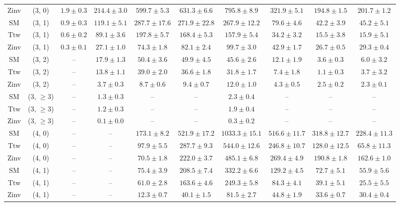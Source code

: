\begin{table}[h!]
{\begin{tabular}{cccccccccc}
	Zinv & (3, 0) & $1.9\pm 0.3$ & $214.4\pm 3.0$ & $599.7\pm 5.3$ & $631.3\pm 6.6$ & $795.8\pm 8.9$ & $321.9\pm 5.1$ & $194.8\pm 1.5$ & $201.7\pm 1.2$ \\[0.5ex] 
	SM & (3, 1) & $0.9\pm 0.3$ & $119.1\pm 5.1$ & $287.7\pm 17.6$ & $271.9\pm 22.8$ & $267.9\pm 12.2$ & $79.6\pm 4.6$ & $42.2\pm 3.9$ & $45.2\pm 5.1$ \\[0.5ex] 
	Ttw & (3, 1) & $0.6\pm 0.2$ & $89.1\pm 3.6$ & $197.8\pm 5.7$ & $168.4\pm 5.3$ & $157.9\pm 5.4$ & $34.2\pm 3.2$ & $15.5\pm 3.8$ & $15.9\pm 5.1$ \\[0.5ex] 
	Zinv & (3, 1) & $0.3\pm 0.1$ & $27.1\pm 1.0$ & $74.3\pm 1.8$ & $82.1\pm 2.4$ & $99.7\pm 3.0$ & $42.9\pm 1.7$ & $26.7\pm 0.5$ & $29.3\pm 0.4$ \\[0.5ex] 
	SM & (3, 2) & -- & $17.9\pm 1.3$ & $50.4\pm 3.6$ & $49.9\pm 4.5$ & $45.6\pm 2.6$ & $12.1\pm 1.9$ & $3.6\pm 0.3$ & $6.0\pm 3.2$ \\[0.5ex] 
	Ttw & (3, 2) & -- & $13.8\pm 1.1$ & $39.0\pm 2.0$ & $36.6\pm 1.8$ & $31.8\pm 1.7$ & $7.4\pm 1.8$ & $1.1\pm 0.3$ & $3.7\pm 3.2$ \\[0.5ex] 
	Zinv & (3, 2) & -- & $3.7\pm 0.3$ & $8.7\pm 0.6$ & $9.4\pm 0.7$ & $12.0\pm 1.0$ & $4.3\pm 0.5$ & $2.5\pm 0.2$ & $2.3\pm 0.1$ \\[0.5ex] 
	SM & (3, $\ge3$) & -- & $1.3\pm 0.3$ & -- & -- & $2.3\pm 0.4$ & -- & -- & -- \\[0.5ex] 
	Ttw & (3, $\ge3$) & -- & $1.2\pm 0.3$ & -- & -- & $1.9\pm 0.4$ & -- & -- & -- \\[0.5ex] 
	Zinv & (3, $\ge3$) & -- & $0.1\pm 0.0$ & -- & -- & $0.3\pm 0.2$ & -- & -- & -- \\[0.5ex] 
	SM & (4, 0) & -- & -- & $173.1\pm 8.2$ & $521.9\pm 17.2$ & $1033.3\pm 15.1$ & $516.6\pm 11.7$ & $318.8\pm 12.7$ & $228.4\pm 11.3$ \\[0.5ex] 
	Ttw & (4, 0) & -- & -- & $97.9\pm 5.5$ & $287.7\pm 9.3$ & $544.0\pm 12.6$ & $246.8\pm 10.7$ & $128.0\pm 12.5$ & $65.8\pm 11.3$ \\[0.5ex] 
	Zinv & (4, 0) & -- & -- & $70.5\pm 1.8$ & $222.0\pm 3.7$ & $485.1\pm 6.8$ & $269.4\pm 4.9$ & $190.8\pm 1.8$ & $162.6\pm 1.0$ \\[0.5ex] 
	SM & (4, 1) & -- & -- & $75.4\pm 3.9$ & $208.5\pm 7.4$ & $332.2\pm 6.6$ & $129.2\pm 4.5$ & $72.7\pm 5.1$ & $55.9\pm 5.6$ \\[0.5ex] 
	Ttw & (4, 1) & -- & -- & $61.0\pm 2.8$ & $163.6\pm 4.6$ & $249.3\pm 5.8$ & $84.3\pm 4.1$ & $39.1\pm 5.1$ & $25.5\pm 5.5$ \\[0.5ex] 
	Zinv & (4, 1) & -- & -- & $12.3\pm 0.7$ & $40.1\pm 1.5$ & $81.5\pm 2.7$ & $44.8\pm 1.9$ & $33.6\pm 0.7$ & $30.4\pm 0.4$ \\[0.5ex] 

\end{tabular}}
\end{table}
